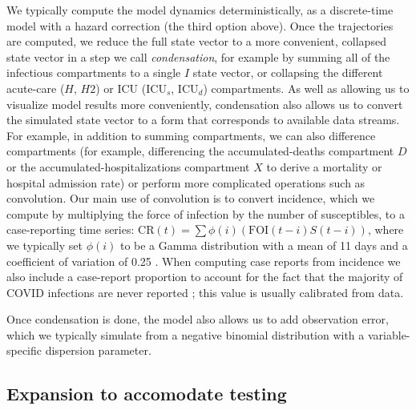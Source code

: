 \documentclass[12pt]{article}\usepackage[]{graphicx}\usepackage[]{color}
\begin{document}
We typically compute the model dynamics deterministically, as a discrete-time model with a hazard
correction (the third option above).  Once the trajectories are computed, we reduce the full state vector to a more convenient, collapsed state vector in a step we call \emph{condensation}, for
example by summing all of the infectious compartments to a single $I$ state vector, or collapsing the different acute-care ($H$, $H2$) or ICU ($\textrm{ICU}_s$, $\textrm{ICU}_d$) compartments. 
As well as allowing us to visualize model results more conveniently, condensation also allows us to
convert the simulated state vector to a form that corresponds to available data streams.
For example, in addition to summing compartments, we can also difference compartments (for example, differencing
the accumulated-deaths compartment $D$ or the accumulated-hospitalizations compartment $X$ to
derive a mortality or hospital admission rate) or perform more complicated operations such as convolution. Our main use of convolution is to convert incidence, which we compute by multiplying the force of infection by the number of susceptibles, to a case-reporting time series: $\textrm{CR}(t) = \sum \phi(i) (\textrm{FOI}(t-i) S(t-i))$, where we typically set $\phi(i)$ to be a Gamma distribution with a mean of 11 days and a coefficient of variation of 0.25 . When computing case reports from incidence we also include a case-report proportion  to account for the fact that the majority of COVID infections are never reported \cite{Doug+2020}; this value is usually calibrated from data.

Once condensation is done, the model also allows us to add observation error, which we typically simulate from a negative binomial distribution with a variable-specific dispersion parameter.

\subsection*{Expansion to accomodate testing}
\end{document}
